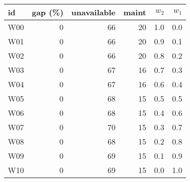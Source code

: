 \begin{tabular}{lrrrrr}
\toprule
  id &  gap (\%) &  unavailable &  maint &  $w_2$ &  $w_1$ \\
\midrule
 W00 &         0 &           66 &     20 &    1.0 &    0.0 \\
 W01 &         0 &           66 &     20 &    0.9 &    0.1 \\
 W02 &         0 &           66 &     20 &    0.8 &    0.2 \\
 W03 &         0 &           67 &     16 &    0.7 &    0.3 \\
 W04 &         0 &           67 &     16 &    0.6 &    0.4 \\
 W05 &         0 &           68 &     15 &    0.5 &    0.5 \\
 W06 &         0 &           68 &     15 &    0.4 &    0.6 \\
 W07 &         0 &           70 &     15 &    0.3 &    0.7 \\
 W08 &         0 &           68 &     15 &    0.2 &    0.8 \\
 W09 &         0 &           69 &     15 &    0.1 &    0.9 \\
 W10 &         0 &           69 &     15 &    0.0 &    1.0 \\
\bottomrule
\end{tabular}
